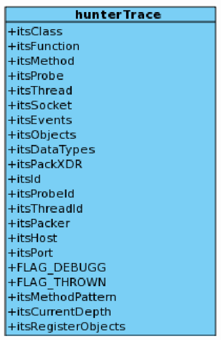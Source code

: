 \documentclass[12pt,legalpaper]{report}
\begin{document}
\begin{figure}
\centering
\begin{minipage}[c]{5.5cm}
\includegraphics[scale=0.6]{images/Clases/hunterTraceAttr.eps}
\end{minipage}
\begin{minipage}[c]{5.5cm}

\end{minipage}
\end{figure}
\end{document}
